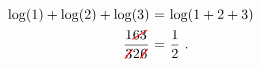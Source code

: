\documentclass{standalone}
\newcommand{\cancel}[1]{%
	\tikz[baseline=(tocancel.base)]{
		\node[inner sep=0pt,outer sep=0pt] (tocancel) {#1};
		\draw[red,thick,line cap=round] (tocancel.south west) -- (tocancel.north east);
	}%
}%
\begin{document}
$
\begin{array}{@{}r@{\,\,}c@{\,\,}l@{}}
	\displaystyle\log(1)+\log(2)+\log(3)&=&\displaystyle\log(1+2+3)\\[1ex]
	\displaystyle\frac{1\cancel{63}}{\cancel{3}2\cancel{6}}&=&\displaystyle\frac{1}{2}~.
\end{array}
$
\end{document}
